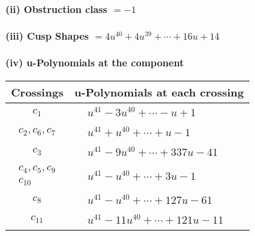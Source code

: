 \documentclass[1p]{elsarticle_modified}
\theoremstyle{definition}
\begin{document}
\flushleft \textbf{(ii) Obstruction class $= -1$}\\~\\
\flushleft \textbf{(iii) Cusp Shapes $= 4 u^{40}+4 u^{39}+\cdots+16 u+14$}\\~\\
\newpage\renewcommand{\arraystretch}{1}
\flushleft \textbf{(iv) u-Polynomials at the component}\newline \\
\begin{tabular}{m{50pt}|m{274pt}}
Crossings & \hspace{64pt}u-Polynomials at each crossing \\
\hline $$\begin{aligned}c_{1}\end{aligned}$$&$\begin{aligned}
&u^{41}-3 u^{40}+\cdots- u+1
\end{aligned}$\\
\hline $$\begin{aligned}c_{2},c_{6},c_{7}\end{aligned}$$&$\begin{aligned}
&u^{41}+u^{40}+\cdots+u-1
\end{aligned}$\\
\hline $$\begin{aligned}c_{3}\end{aligned}$$&$\begin{aligned}
&u^{41}-9 u^{40}+\cdots+337 u-41
\end{aligned}$\\
\hline $$\begin{aligned}c_{4},c_{5},c_{9}\\c_{10}\end{aligned}$$&$\begin{aligned}
&u^{41}- u^{40}+\cdots+3 u-1
\end{aligned}$\\
\hline $$\begin{aligned}c_{8}\end{aligned}$$&$\begin{aligned}
&u^{41}- u^{40}+\cdots+127 u-61
\end{aligned}$\\
\hline $$\begin{aligned}c_{11}\end{aligned}$$&$\begin{aligned}
&u^{41}-11 u^{40}+\cdots+121 u-11
\end{aligned}$\\
\hline
\end{tabular}\\~\\
\end{document}
